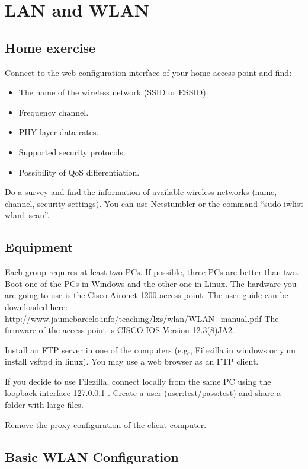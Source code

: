 \chapter{LAN and WLAN}

\section{Home exercise}

Connect to the web configuration interface of your home access point and find:
\begin{itemize}
\item The name of the wireless network (SSID or ESSID).
\item Frequency channel.
\item PHY layer data rates.
\item Supported security protocols.
\item Possibility of QoS differentiation.
\end{itemize}

Do a survey and find the information of available wireless networks (name, channel, security settings).
You can use Netstumbler or the command ``sudo iwlist wlan1 scan''.

\section{Equipment}

Each group requires at least two PCs.
If possible, three PCs are better than two.
Boot one of the PCs in Windows and the other one in Linux.
The hardware you are going to use is the Cisco Aironet 1200 access point.
The user guide can be downloaded here: \ifpdf \url{http://www.jaumebarcelo.info/teaching/lxs/wlan/WLAN_manual.pdf} \fi
The firmware of the access point is CISCO IOS Version 12.3(8)JA2.

Install an FTP server in one of the computers (e.g., Filezilla in windows or yum install vsftpd in linux).
You may use a web browser as an FTP client.

If you decide to use Filezilla, connect locally from the same PC using the loopback interface 127.0.0.1 .
Create a user (user:test/pass:test) and share a folder with large files.

Remove the proxy configuration of the client computer.

\section{Basic WLAN Configuration}

